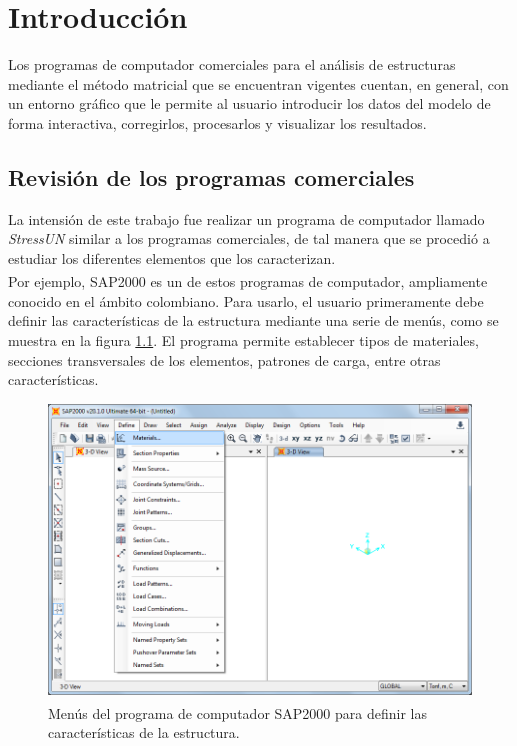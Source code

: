  \chapter{Introducción}
\label{chap:antecedentes}

Los programas de computador comerciales para el análisis de estructuras mediante el método matricial que se encuentran vigentes cuentan, en general, con un entorno gráfico que le permite al usuario introducir los datos del modelo de forma interactiva, corregirlos, procesarlos y visualizar los resultados.\\


\section{Revisión de los programas comerciales}
La intensión de este trabajo fue realizar un programa de computador llamado \textit{StressUN} similar a los programas comerciales, de tal manera que se procedió a estudiar los diferentes elementos que los caracterizan. \\

Por ejemplo, SAP2000\textsuperscript{\textregistered} es un de estos programas de computador, ampliamente conocido en el ámbito colombiano. Para usarlo, el usuario primeramente debe definir las características de la estructura mediante una serie de menús, como se muestra en la figura \ref{fig:sap2000_toolbar}. El programa permite establecer tipos de materiales, secciones transversales de los elementos, patrones de carga, entre otras características.

\begin{figure}[ht]
    \centering
    \includegraphics[width=1\textwidth]{metodologia/sap2000_toolbar.png}
    \caption{Menús del programa de computador SAP2000\textsuperscript{\textregistered} para definir las características de la estructura.}
    \label{fig:sap2000_toolbar}
\end{figure}

